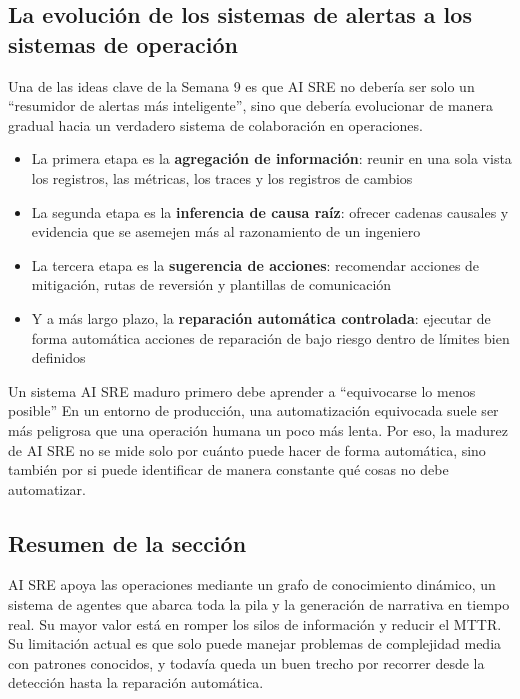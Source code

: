 \documentclass[a4paper]{article}
\begin{document}
\subsection{La evolución de los sistemas de alertas a los sistemas de operación}

Una de las ideas clave de la Semana 9 es que AI SRE no debería ser solo un ``resumidor de alertas más inteligente'', sino que debería evolucionar de manera gradual hacia un verdadero sistema de colaboración en operaciones.

\begin{itemize}
    \item La primera etapa es la \textbf{agregación de información}: reunir en una sola vista los registros, las métricas, los traces y los registros de cambios
    \item La segunda etapa es la \textbf{inferencia de causa raíz}: ofrecer cadenas causales y evidencia que se asemejen más al razonamiento de un ingeniero
    \item La tercera etapa es la \textbf{sugerencia de acciones}: recomendar acciones de mitigación, rutas de reversión y plantillas de comunicación
    \item Y a más largo plazo, la \textbf{reparación automática controlada}: ejecutar de forma automática acciones de reparación de bajo riesgo dentro de límites bien definidos
\end{itemize}

\begin{knowledgebox}{Un sistema AI SRE maduro primero debe aprender a ``equivocarse lo menos posible''}
En un entorno de producción, una automatización equivocada suele ser más peligrosa que una operación humana un poco más lenta. Por eso, la madurez de AI SRE no se mide solo por cuánto puede hacer de forma automática, sino también por si puede identificar de manera constante qué cosas no debe automatizar.
\end{knowledgebox}

\subsection{Resumen de la sección}

AI SRE apoya las operaciones mediante un grafo de conocimiento dinámico, un sistema de agentes que abarca toda la pila y la generación de narrativa en tiempo real. Su mayor valor está en romper los silos de información y reducir el MTTR. Su limitación actual es que solo puede manejar problemas de complejidad media con patrones conocidos, y todavía queda un buen trecho por recorrer desde la detección hasta la reparación automática.
\end{document}
